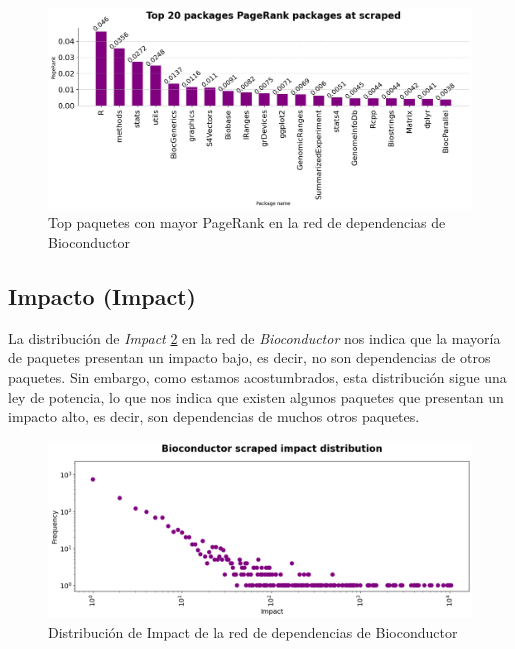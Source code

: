 \begin{figure}[ht!]
    \begin{center}
        \includegraphics[width=1\textwidth]{img/bioconductor/top_pagerrank_packages.png}
        \caption{Top paquetes con mayor PageRank en la red de dependencias de Bioconductor}
        \label{fig:bioconductor_top_pagerank_packages}
    \end{center}
\end{figure}

\subsection{Impacto (Impact)}

La distribución de \textit{Impact} \ref{fig:bioconductor_impact_dist} en la red de \textit{Bioconductor} nos indica
que la mayoría de paquetes presentan un impacto bajo, es decir, no son dependencias de otros paquetes. Sin embargo,
como estamos acostumbrados, esta distribución sigue una ley de potencia, lo que nos indica que existen algunos paquetes
que presentan un impacto alto, es decir, son dependencias de muchos otros paquetes.

\begin{figure}[ht!]
    \begin{center}
        \includegraphics[width=1\textwidth]{img/bioconductor/impact.png}
        \caption{Distribución de Impact de la red de dependencias de Bioconductor}
        \label{fig:bioconductor_impact_dist}
    \end{center}
\end{figure}

